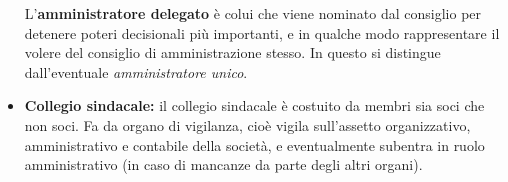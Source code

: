 \documentclass[a4paper,11pt]{article}
\begin{document}
\begin{itemize}
L'\textbf{amministratore delegato} è colui che viene nominato dal consiglio per detenere poteri decisionali più importanti, e in qualche modo rappresentare il volere del consiglio di amministrazione stesso.
In questo si distingue dall'eventuale \textit{amministratore unico}.

\item \textbf{Collegio sindacale:}
 il collegio sindacale è costuito da membri sia soci che non soci.
Fa da organo di vigilanza, cioè vigila sull'assetto organizzativo, amministrativo e contabile della società, e eventualmente subentra in ruolo amministrativo (in caso di mancanze da parte degli altri organi). 
\end{itemize}
\end{document}

